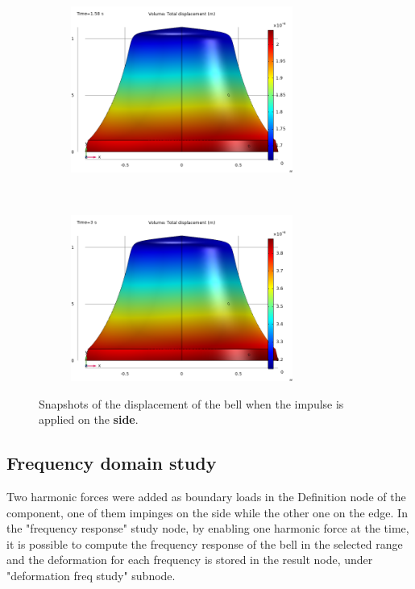 \documentclass[a4paper]{article}
\begin{document}
\begin{figure}[h!]
	\begin{subfigure}{0.47\textwidth}
		\includegraphics[width=0.8\textwidth]{time domain study side/middle time.png}
	\end{subfigure}
	~
	\begin{subfigure}{0.47\textwidth}
		\includegraphics[width=0.8\textwidth]{time domain study side/final time.png}
	\end{subfigure}
	\caption{Snapshots of the displacement of the bell when the impulse is applied on the \textbf{side}.}
	\label{fig:timeSide}
\end{figure}

\subsection{Frequency domain study}
Two harmonic forces were added as boundary loads in the Definition node of the component, one of them impinges on the side while the other one on the edge. In the "frequency response" study node, by enabling one harmonic force at the time, it is possible to compute the frequency response of the bell in the selected range and the deformation for each frequency is stored in the result node, under "deformation freq study" subnode. 
\end{document}
